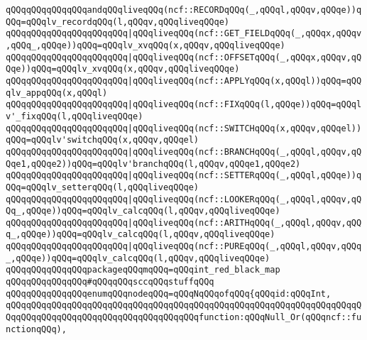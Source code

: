 \verb|qQQqqQQqqQQqqQQqandqQQqliveqQQq(ncf::RECORDqQQq(_,qQQql,qQQqv,qQQqe))qQQq=qQQqlv_recordqQQq(l,qQQqv,qQQqliveqQQqe)|\newline
\verb|qQQqqQQqqQQqqQQqqQQqqQQq|\verb#|qQQqliveqQQq(ncf::GET_FIELDqQQq(_,qQQqx,qQQqv,qQQq_,qQQqe))qQQq=qQQqlv_xvqQQq(x,qQQqv,qQQqliveqQQqe)#\newline
\verb|qQQqqQQqqQQqqQQqqQQqqQQq|\verb#|qQQqliveqQQq(ncf::OFFSETqQQq(_,qQQqx,qQQqv,qQQqe))qQQq=qQQqlv_xvqQQq(x,qQQqv,qQQqliveqQQqe)#\newline
\verb|qQQqqQQqqQQqqQQqqQQqqQQq|\verb#|qQQqliveqQQq(ncf::APPLYqQQq(x,qQQql))qQQq=qQQqlv_appqQQq(x,qQQql)#\newline
\verb|qQQqqQQqqQQqqQQqqQQqqQQq|\verb#|qQQqliveqQQq(ncf::FIXqQQq(l,qQQqe))qQQq=qQQqlv'_fixqQQq(l,qQQqliveqQQqe)#\newline
\verb|qQQqqQQqqQQqqQQqqQQqqQQq|\verb#|qQQqliveqQQq(ncf::SWITCHqQQq(x,qQQqv,qQQqel))qQQq=qQQqlv'switchqQQq(x,qQQqv,qQQqel)#\newline
\verb|qQQqqQQqqQQqqQQqqQQqqQQq|\verb#|qQQqliveqQQq(ncf::BRANCHqQQq(_,qQQql,qQQqv,qQQqe1,qQQqe2))qQQq=qQQqlv'branchqQQq(l,qQQqv,qQQqe1,qQQqe2)#\newline
\verb|qQQqqQQqqQQqqQQqqQQqqQQq|\verb#|qQQqliveqQQq(ncf::SETTERqQQq(_,qQQql,qQQqe))qQQq=qQQqlv_setterqQQq(l,qQQqliveqQQqe)#\newline
\verb|qQQqqQQqqQQqqQQqqQQqqQQq|\verb#|qQQqliveqQQq(ncf::LOOKERqQQq(_,qQQql,qQQqv,qQQq_,qQQqe))qQQq=qQQqlv_calcqQQq(l,qQQqv,qQQqliveqQQqe)#\newline
\verb|qQQqqQQqqQQqqQQqqQQqqQQq|\verb#|qQQqliveqQQq(ncf::ARITHqQQq(_,qQQql,qQQqv,qQQq_,qQQqe))qQQq=qQQqlv_calcqQQq(l,qQQqv,qQQqliveqQQqe)#\newline
\verb|qQQqqQQqqQQqqQQqqQQqqQQq|\verb#|qQQqliveqQQq(ncf::PUREqQQq(_,qQQql,qQQqv,qQQq_,qQQqe))qQQq=qQQqlv_calcqQQq(l,qQQqv,qQQqliveqQQqe)#\newline
\newline
\verb|qQQqqQQqqQQqqQQqpackageqQQqmqQQq=qQQqint_red_black_map|\newline
\newline
\verb|qQQqqQQqqQQqqQQq#qQQqqQQqsccqQQqstuffqQQq|\newline
\newline
\verb|qQQqqQQqqQQqqQQqenumqQQqnodeqQQq=qQQqNqQQqofqQQq{qQQqid:qQQqInt,|\newline
\verb|qQQqqQQqqQQqqQQqqQQqqQQqqQQqqQQqqQQqqQQqqQQqqQQqqQQqqQQqqQQqqQQqqQQqqQQqqQQqqQQqqQQqqQQqqQQqqQQqqQQqqQQqqQQqfunction:qQQqNull_Or(qQQqncf::functionqQQq),|\newline
